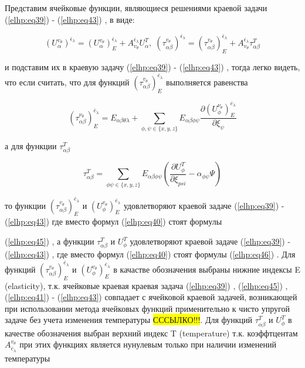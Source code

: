 Представим ячейковые функции, являющиеся решениями краевой задачи 
(\ref{elhp:eq39})
-
(\ref{elhp:eq43})
, в виде:

\begin{equation}
    \label{elhp:eq44}
    \left( U_{\alpha}^{v_{\theta}} \right)^{ \overline{\epsilon}_{\lambda}} =
    \left( U_{\alpha}^{v_{\theta}} \right)^{ \overline{\epsilon}_{\lambda}}_E +
    A_{v_{\theta}}^{ \overline{\epsilon}_{\lambda}}
    U_{\alpha}^T
    ,\;
    \left( \tau_{\alpha\beta}^{v_{\theta}} \right)^{ \overline{\epsilon}_{\lambda}} =
    \left( \tau_{\alpha\beta}^{v_{\theta}} \right)^{ \overline{\epsilon}_{\lambda}}_E +
    A_{v_{\theta}}^{ \overline{\epsilon}_{\lambda}}
    \tau_{\alpha\beta}^T
\end{equation}

и подставим их в краевую задачу 
(\ref{elhp:eq39})
-
(\ref{elhp:eq43})
, тогда легко видеть, что если считать, что для функций 
$\left( \tau_{ \alpha\beta}^{ v_{\theta}} \right)_E^{ \overline{e}_{\lambda}}$
выполняется равенства

\begin{equation}
    \label{elhp:eq45}
    \left( \tau_{\alpha\beta}^{\nu_{\theta}} \right)_E^{ \overline{e}_{\lambda} }  =
    E_{\alpha\beta\theta\lambda} + \sum_{ \phi,\psi \in \{x,y,z\} } 
    E_{\alpha\beta\phi\psi} \frac{ \partial \left( U_{\phi}^{\nu_{\theta}} \right)_E^{\overline{e}_{\lambda}} }
    { \partial \xi_{\psi}}
\end{equation}

а для функции 
$\tau_{ \alpha\beta}^T$

\begin{equation}
    \label{elhp:eq46}
    \tau_{ \alpha\beta}^T = \sum_{ \phi\psi \in \{x,y,z\}} E_{ \alpha\beta \phi\psi}
    \left( \frac{ \partial U_{\phi}^T}{ \partial \xi_{psi}} - \alpha_{ \phi\psi} \Psi \right) 
\end{equation}

то функции  
$\left( \tau_{ \alpha\beta}^{ v_{\theta}} \right)_E^{ \overline{e}_{\lambda}}$
и 
$\left( U_{ \phi}^{ v_{\theta}} \right)_E^{ \overline{e}_{\lambda}}$
удовлетворяют краевой задаче 
(\ref{elhp:eq39})
-
(\ref{elhp:eq43})
где вместо формул 
(\ref{elhp:eq40})
стоят формулы

(\ref{elhp:eq45})
, а функции 
$\tau_{ \alpha\beta}^T$
и
$U_{ \phi}^T$
удовлетворяют краевой задаче 
(\ref{elhp:eq39})
-
(\ref{elhp:eq43})
, где вместо формул 
(\ref{elhp:eq40})
стоят
формулы 
(\ref{elhp:eq46})
. Для функций 
$\left( \tau_{ \alpha\beta}^{ v_{\theta}} \right)_E^{ \overline{e}_{\lambda}}$
и 
$\left( U_{ \phi}^{ v_{\theta}} \right)_E^{ \overline{e}_{\lambda}}$
в качастве обозначения выбраны нижние индексы E (elasticity), т.к. ячейковые
краевая краевая задача 
(\ref{elhp:eq39})
, 
(\ref{elhp:eq45})
, 
(\ref{elhp:eq41})
-
(\ref{elhp:eq43})
совпадает с ячейковой краевой задачей, 
возникающей при использовании метода ячейковых функций применительно к чисто
упругой задаче без учета изменения температуры \colorbox{yellow}{СССЫЛКО!!!}. Для функций
$\tau_{ \alpha\beta}^T$
и
$U_{ \phi}^T$
в качестве обозначения выбран верхний индекс T (temperature) т.к. коэффтцентам 
$ {A}_{ \overline{e}_{\lambda}}^{ v_{\theta}} $
при этих функциях является нунулевым только при наличии изменений температуры

